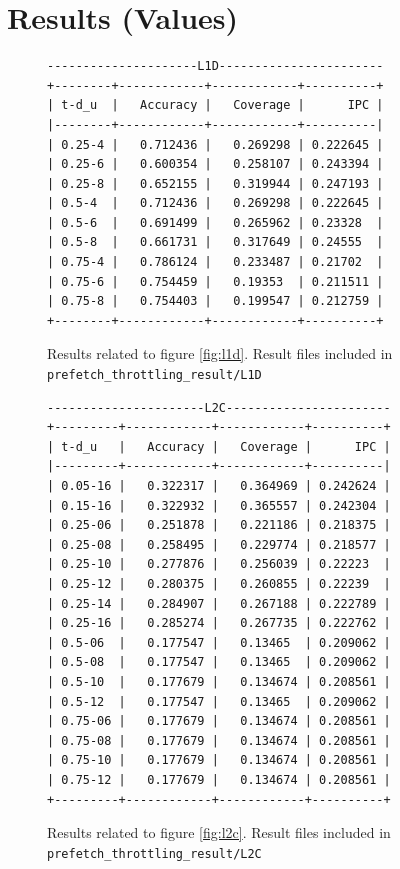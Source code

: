\documentclass[11pt, swedish, openany]{book}
\begin{document}
\section{Results (Values)}
\label{sec:result_values}

\begin{figure}[H]
    \centering
    \begin{BVerbatim}
---------------------L1D-----------------------
+--------+------------+------------+----------+
| t-d_u  |   Accuracy |   Coverage |      IPC |
|--------+------------+------------+----------|
| 0.25-4 |   0.712436 |   0.269298 | 0.222645 |
| 0.25-6 |   0.600354 |   0.258107 | 0.243394 |
| 0.25-8 |   0.652155 |   0.319944 | 0.247193 |
| 0.5-4  |   0.712436 |   0.269298 | 0.222645 |
| 0.5-6  |   0.691499 |   0.265962 | 0.23328  |
| 0.5-8  |   0.661731 |   0.317649 | 0.24555  |
| 0.75-4 |   0.786124 |   0.233487 | 0.21702  |
| 0.75-6 |   0.754459 |   0.19353  | 0.211511 |
| 0.75-8 |   0.754403 |   0.199547 | 0.212759 |
+--------+------------+------------+----------+
    \end{BVerbatim}
    \caption{Results related to figure \ref{fig:l1d}. Result files included in \texttt{prefetch\_throttling\_result/L1D}}
\end{figure}

\begin{figure}[H]
    \centering
    \begin{BVerbatim}
----------------------L2C-----------------------
+---------+------------+------------+----------+
| t-d_u   |   Accuracy |   Coverage |      IPC |
|---------+------------+------------+----------|
| 0.05-16 |   0.322317 |   0.364969 | 0.242624 |
| 0.15-16 |   0.322932 |   0.365557 | 0.242304 |
| 0.25-06 |   0.251878 |   0.221186 | 0.218375 |
| 0.25-08 |   0.258495 |   0.229774 | 0.218577 |
| 0.25-10 |   0.277876 |   0.256039 | 0.22223  |
| 0.25-12 |   0.280375 |   0.260855 | 0.22239  |
| 0.25-14 |   0.284907 |   0.267188 | 0.222789 |
| 0.25-16 |   0.285274 |   0.267735 | 0.222762 |
| 0.5-06  |   0.177547 |   0.13465  | 0.209062 |
| 0.5-08  |   0.177547 |   0.13465  | 0.209062 |
| 0.5-10  |   0.177679 |   0.134674 | 0.208561 |
| 0.5-12  |   0.177547 |   0.13465  | 0.209062 |
| 0.75-06 |   0.177679 |   0.134674 | 0.208561 |
| 0.75-08 |   0.177679 |   0.134674 | 0.208561 |
| 0.75-10 |   0.177679 |   0.134674 | 0.208561 |
| 0.75-12 |   0.177679 |   0.134674 | 0.208561 |
+---------+------------+------------+----------+
    \end{BVerbatim}
    \caption{Results related to figure \ref{fig:l2c}. Result files included in \texttt{prefetch\_throttling\_result/L2C}}
\end{figure}
\end{document}
